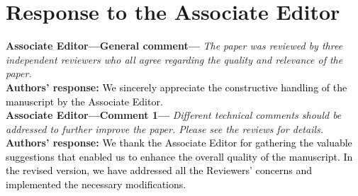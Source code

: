 \section{Response to the Associate Editor}
\textbf{Associate Editor---General comment---}\textit{%
The paper was reviewed by three independent reviewers who all agree regarding the quality and relevance of the paper. }\\[2mm]
\textbf{Authors' response:} \textcolor{black}{We sincerely appreciate the constructive handling of the manuscript by the Associate Editor.}\\[4mm]
\textbf{Associate Editor---Comment 1---}\textit{%
Different technical comments should be addressed to further improve the paper. Please see the reviews for details.}\\[2mm]
\textbf{Authors' response:} \textcolor{black}{We thank the Associate Editor for gathering the valuable suggestions that enabled us to enhance the overall quality of the manuscript. In the revised version, we have addressed all the Reviewers' concerns and implemented the necessary modifications.}